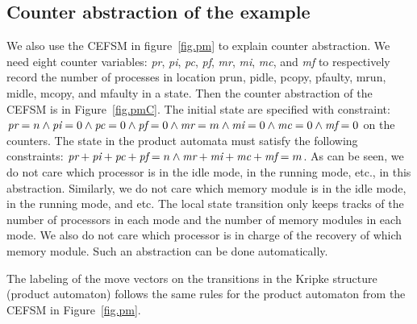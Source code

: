 \subsection*{Counter abstraction of the example} 
We also use the CEFSM in figure~\ref{fig.pm} to explain counter abstraction. 
We need eight counter variables: 
{\em pr}, 
{\em pi}, 
{\em pc}, 
{\em pf}, 
{\em mr}, 
{\em mi}, 
{\em mc}, and 
{\em mf} to respectively record the 
number of processes in location prun, pidle, pcopy, pfaulty, mrun, midle, mcopy, and mfaulty
in a state.  
Then the counter abstraction of the CEFSM is in Figure~\ref{fig.pmC}.  
The initial state are specified with constraint: 
$\mbox{\em pr}=n
\wedge \mbox{\em pi}=0
\wedge \mbox{\em pc}=0
\wedge \mbox{\em pf}=0
\wedge \mbox{\em mr}=m
\wedge \mbox{\em mi}=0
\wedge \mbox{\em mc}=0
\wedge \mbox{\em mf}=0$
on the counters.  
The state in the product automata must satisfy the following constraints: 
$\mbox{\em pr}+\mbox{\em pi}+\mbox{\em pc}+\mbox{\em pf}=n
\wedge \mbox{\em mr}+\mbox{\em mi}+\mbox{\em mc}+\mbox{\em mf}=m$.  
As can be seen, we do not care which processor is in the idle mode, 
in the running mode, etc., in this abstraction. 
Similarly, we do not care which memory module is in the idle mode, in the running mode, and etc. 
The local state transition only keeps tracks of the number of processors in each mode and 
the number of memory modules in each mode. 
We also do not care which processor is in charge of the recovery of which memory module.  
Such an abstraction can be done automatically.  

The labeling of the move vectors on the transitions in the Kripke structure (product automaton)
follows the same rules for the product automaton from the CEFSM in Figure~\ref{fig.pm}.  




